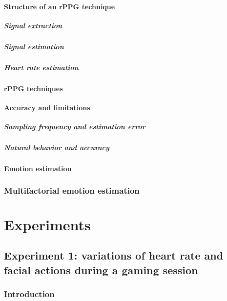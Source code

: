     \subsection{Structure of an rPPG technique}
      \subsubsection{Signal extraction}
      \subsubsection{Signal estimation}
      \subsubsection{Heart rate estimation}
    \subsection{rPPG techniques}
    \subsection{Accuracy and limitations}
      \subsubsection{Sampling frequency and estimation error}
      \subsubsection{Natural behavior and accuracy}
    \subsection{Emotion estimation}
  \section{Multifactorial emotion estimation}

\part{Experiments}

\chapter{Experiment 1: variations of heart rate and facial actions during a gaming session}
  \section{Introduction}
